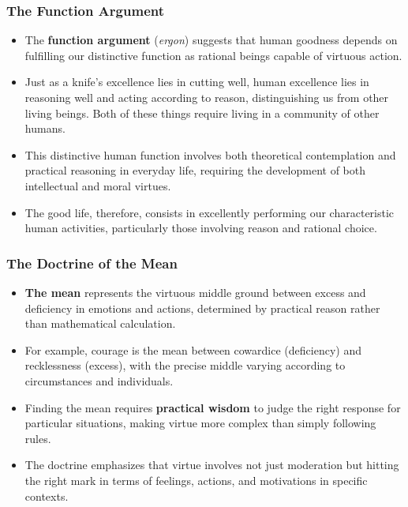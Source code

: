 \documentclass{beamer}
\begin{document}
\begin{frame}
    \frametitle{The Function Argument}
    \begin{itemize}
        \item The \textbf{function argument} (\textit{ergon}) suggests that human goodness depends on fulfilling our distinctive function as rational beings capable of virtuous action.
        
        \item Just as a knife's excellence lies in cutting well, human excellence lies in reasoning well and acting according to reason, distinguishing us from other living beings. Both of these things require living in a community of other humans.
        
        \item This distinctive human function involves both theoretical contemplation and practical reasoning in everyday life, requiring the development of both intellectual and moral virtues.
        
        \item The good life, therefore, consists in excellently performing our characteristic human activities, particularly those involving reason and rational choice.
    \end{itemize}
\end{frame}

\begin{frame}
    \frametitle{The Doctrine of the Mean}
    \begin{itemize}
        \item \textbf{The mean} represents the virtuous middle ground between excess and deficiency in emotions and actions, determined by practical reason rather than mathematical calculation.
        
        \item For example, courage is the mean between cowardice (deficiency) and recklessness (excess), with the precise middle varying according to circumstances and individuals.
        
        \item Finding the mean requires \textbf{practical wisdom} to judge the right response for particular situations, making virtue more complex than simply following rules.
        
        \item The doctrine emphasizes that virtue involves not just moderation but hitting the right mark in terms of feelings, actions, and motivations in specific contexts.
    \end{itemize}
\end{frame}
\end{document}
